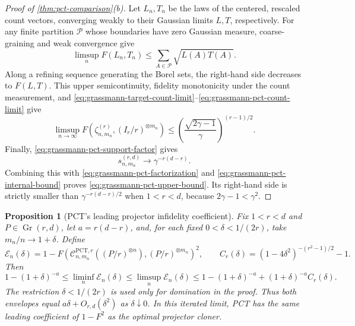 \documentclass[11pt]{article}
\newtheorem{proposition}[proposition]{Proposition}
\theoremstyle{remark}
\theoremstyle{plain}
\newcommand{\cC}{\mathcal C}
\newcommand{\Gr}{\operatorname{Gr}}
\newcommand{\ot}{\otimes}
\begin{document}
\begin{proof}[Proof of \cref{thm:pct-comparison}\textup{(b)}]
Let \(L_n,T_n\) be the laws of the centered, rescaled count vectors,
converging weakly to their Gaussian
limits \(L,T\), respectively.  For any finite partition \(\mathcal P\) whose
boundaries have zero Gaussian measure, coarse-graining and weak
convergence give
\[
  \limsup_n F(L_n,T_n)
  \le\sum_{A\in\mathcal P}\sqrt{L(A)T(A)}.
\]
Along a refining sequence generating the Borel sets, the right-hand side
decreases to \(F(L,T)\).  This upper semicontinuity, fidelity monotonicity
under the count measurement, and
\eqref{eq:grassmann-target-count-limit}--\eqref{eq:grassmann-pct-count-limit}
give
\begin{equation}
  \limsup_{n\to\infty}
  F\!\left(\zeta_{n,m_n}^{(r)},(I_r/r)^{\ot m_n}\right)
  \le
  \left(\frac{\sqrt{2\gamma-1}}{\gamma}\right)^{(r-1)/2}.
  \label{eq:grassmann-pct-internal-bound}
\end{equation}
Finally, \eqref{eq:grassmann-pct-support-factor} gives
\[
  s_{n,m_n}^{(r,d)}\longrightarrow\gamma^{-r(d-r)}.
\]
Combining this with \eqref{eq:grassmann-pct-factorization} and
\eqref{eq:grassmann-pct-internal-bound} proves
\eqref{eq:grassmann-pct-upper-bound}.  Its right-hand side is strictly
smaller than \(\gamma^{-r(d-r)/2}\) when \(1<r<d\), because
\(2\gamma-1<\gamma^2\).
\end{proof}

\begin{proposition}[PCT's leading projector infidelity coefficient]
\label{prop:pct-projector-small-error}
Fix \(1<r<d\) and \(P\in\Gr(r,d)\), let \(a=r(d-r)\), and, for each
fixed \(0<\delta<1/(2r)\), take \(m_n/n\to1+\delta\).  Define
\[
  \mathcal E_n(\delta)
  =1-F\!\left(\cC_{n,m_n}^{\mathrm{PCT},r}((P/r)^{\ot n}),
                  (P/r)^{\ot m_n}\right)^2,
  \qquad
  C_r(\delta)=(1-4\delta^2)^{-(r^2-1)/2}-1.
\]
Then
\begin{equation}\label{eq:pct-projector-small-error-envelope}
  1-(1+\delta)^{-a}
  \le\liminf_n\mathcal E_n(\delta)
   \le\limsup_n\mathcal E_n(\delta)
  \le1-(1+\delta)^{-a}+(1+\delta)^{-a}C_r(\delta).
\end{equation}
The restriction \(\delta<1/(2r)\) is used only for domination in the proof.
Thus both envelopes equal \(a\delta+O_{r,d}(\delta^2)\) as
\(\delta\downarrow0\).  In this iterated limit, PCT has the same leading
coefficient of \(1-F^2\) as the optimal projector cloner.
\end{proposition}
\end{document}
